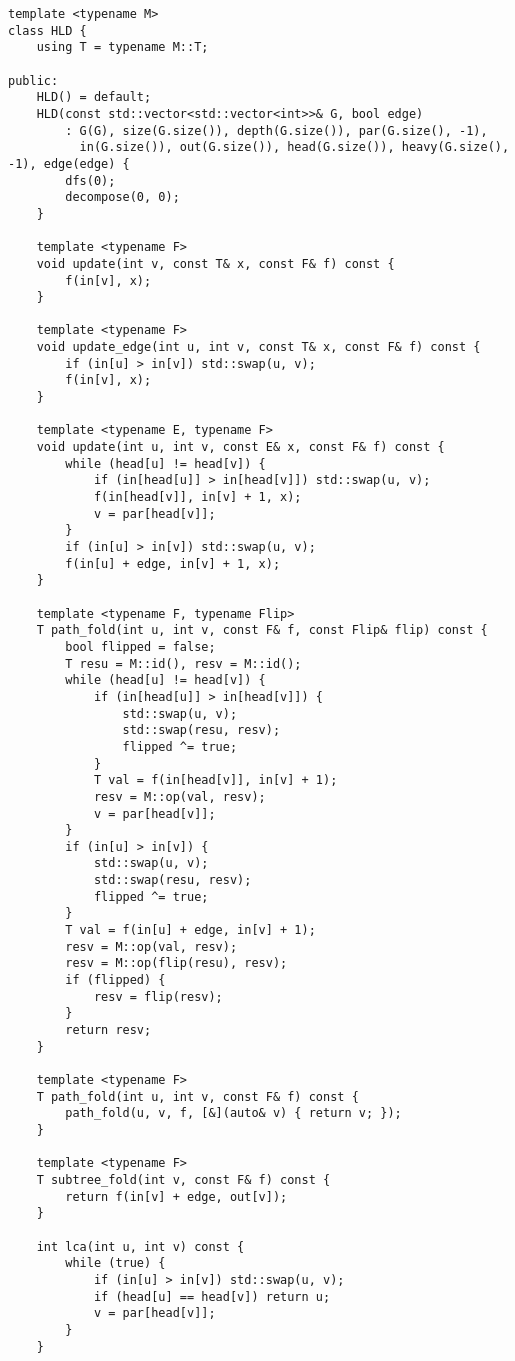\begin{lstlisting}
template <typename M>
class HLD {
    using T = typename M::T;

public:
    HLD() = default;
    HLD(const std::vector<std::vector<int>>& G, bool edge)
        : G(G), size(G.size()), depth(G.size()), par(G.size(), -1),
          in(G.size()), out(G.size()), head(G.size()), heavy(G.size(), -1), edge(edge) {
        dfs(0);
        decompose(0, 0);
    }

    template <typename F>
    void update(int v, const T& x, const F& f) const {
        f(in[v], x);
    }

    template <typename F>
    void update_edge(int u, int v, const T& x, const F& f) const {
        if (in[u] > in[v]) std::swap(u, v);
        f(in[v], x);
    }

    template <typename E, typename F>
    void update(int u, int v, const E& x, const F& f) const {
        while (head[u] != head[v]) {
            if (in[head[u]] > in[head[v]]) std::swap(u, v);
            f(in[head[v]], in[v] + 1, x);
            v = par[head[v]];
        }
        if (in[u] > in[v]) std::swap(u, v);
        f(in[u] + edge, in[v] + 1, x);
    }

    template <typename F, typename Flip>
    T path_fold(int u, int v, const F& f, const Flip& flip) const {
        bool flipped = false;
        T resu = M::id(), resv = M::id();
        while (head[u] != head[v]) {
            if (in[head[u]] > in[head[v]]) {
                std::swap(u, v);
                std::swap(resu, resv);
                flipped ^= true;
            }
            T val = f(in[head[v]], in[v] + 1);
            resv = M::op(val, resv);
            v = par[head[v]];
        }
        if (in[u] > in[v]) {
            std::swap(u, v);
            std::swap(resu, resv);
            flipped ^= true;
        }
        T val = f(in[u] + edge, in[v] + 1);
        resv = M::op(val, resv);
        resv = M::op(flip(resu), resv);
        if (flipped) {
            resv = flip(resv);
        }
        return resv;
    }

    template <typename F>
    T path_fold(int u, int v, const F& f) const {
        path_fold(u, v, f, [&](auto& v) { return v; });
    }

    template <typename F>
    T subtree_fold(int v, const F& f) const {
        return f(in[v] + edge, out[v]);
    }

    int lca(int u, int v) const {
        while (true) {
            if (in[u] > in[v]) std::swap(u, v);
            if (head[u] == head[v]) return u;
            v = par[head[v]];
        }
    }


\end{lstlisting}
